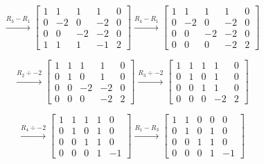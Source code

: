 \begin{equation*}
    \xrightarrow{R_3 - R_1}
    \begin{bmatrix}
        1 & 1  & 1  & 1  & 0 \\
        0 & -2 & 0  & -2 & 0 \\
        0 & 0  & -2 & -2 & 0 \\
        1 & 1  & 1  & -1 & 2
    \end{bmatrix}
    \xrightarrow{R_4 - R_1}
    \begin{bmatrix}
        1 & 1  & 1  & 1  & 0 \\
        0 & -2 & 0  & -2 & 0 \\
        0 & 0  & -2 & -2 & 0 \\
        0 & 0  & 0  & -2 & 2
    \end{bmatrix}
\end{equation*}

\begin{equation*}
    \xrightarrow{R_2 \div -2}
    \begin{bmatrix}
        1 & 1 & 1  & 1  & 0 \\
        0 & 1 & 0  & 1  & 0 \\
        0 & 0 & -2 & -2 & 0 \\
        0 & 0 & 0  & -2 & 2
    \end{bmatrix}
    \xrightarrow{R_3 \div -2}
    \begin{bmatrix}
        1 & 1 & 1 & 1  & 0 \\
        0 & 1 & 0 & 1  & 0 \\
        0 & 0 & 1 & 1  & 0 \\
        0 & 0 & 0 & -2 & 2
    \end{bmatrix}
\end{equation*}

\begin{equation*}
    \xrightarrow{R_4 \div -2}
    \begin{bmatrix}
        1 & 1 & 1 & 1 & 0  \\
        0 & 1 & 0 & 1 & 0  \\
        0 & 0 & 1 & 1 & 0  \\
        0 & 0 & 0 & 1 & -1
    \end{bmatrix}
    \xrightarrow{R_1 - R_3}
    \begin{bmatrix}
        1 & 1 & 0 & 0 & 0  \\
        0 & 1 & 0 & 1 & 0  \\
        0 & 0 & 1 & 1 & 0  \\
        0 & 0 & 0 & 1 & -1
    \end{bmatrix}
\end{equation*}

